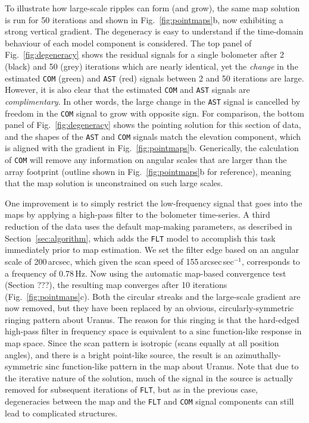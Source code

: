 \documentclass[useAMS,usenatbib,nofootinbib]{mn2e}
\def\sinc{\mathrm{sinc}}
\newcommand{\model}[1]{\texttt{#1}}
\begin{document}
To illustrate how large-scale ripples can form (and grow), the same
map solution is run for 50 iterations and shown in
Fig.~\ref{fig:pointmaps}b, now exhibiting a strong vertical
gradient. The degeneracy is easy to understand if the time-domain
behaviour of each model component is considered. The top panel of
Fig.~\ref{fig:degeneracy} shows the residual signals for a single
bolometer after 2 (black) and 50 (grey) iterations which are nearly
identical, yet the \emph{change} in the estimated \model{COM} (green)
and \model{AST} (red) signals between 2 and 50 iterations are
large. However, it is also clear that the estimated \model{COM} and
\model{AST} signals are \emph{complimentary}. In other words, the
large change in the \model{AST} signal is cancelled by freedom in the
\model{COM} signal to grow with opposite sign. For comparison, the
bottom panel of Fig.~\ref{fig:degeneracy} shows the pointing solution
for this section of data, and the shapes of the \model{AST} and
\model{COM} signals match the elevation component, which is aligned
with the gradient in Fig.~\ref{fig:pointmaps}b. Generically, the
calculation of \model{COM} will remove any information on angular
scales that are larger than the array footprint (outline shown in
Fig.~\ref{fig:pointmaps}b for reference), meaning that the map
solution is unconstrained on such large scales.

One improvement is to simply restrict the low-frequency signal that
goes into the maps by applying a high-pass filter to the bolometer
time-series. A third reduction of the data uses the default map-making
parameters, as described in Section~\ref{sec:algorithm}, which adds
the \model{FLT} model to accomplish this task immediately prior to map
estimation. We set the filter edge based on an angular scale of
200\,arcsec, which given the scan speed of 155\,arcsec\,sec$^{-1}$,
corresponds to a frequency of 0.78\,Hz. Now using the automatic
map-based convergence test (Section ???), the resulting map converges
after 10 iterations (Fig.~\ref{fig:pointmaps}c). Both the circular
streaks and the large-scale gradient are now removed, but they have
been replaced by an obvious, circularly-symmetric ringing pattern
about Uranus. The reason for this ringing is that the hard-edged
high-pass filter in frequency space is equivalent to a $\sinc$
function-like response in map space. Since the scan pattern is
isotropic (scans equally at all position angles), and there is a
bright point-like source, the result is an azimuthally-symmetric
$\sinc$ function-like pattern in the map about Uranus. Note that due
to the iterative nature of the solution, much of the signal in the
source is actually removed for subsequent iterations of \model{FLT},
but as in the previous case, degeneracies between the map and the
\model{FLT} and \model{COM} signal components can still lead to
complicated structures.
\end{document}

